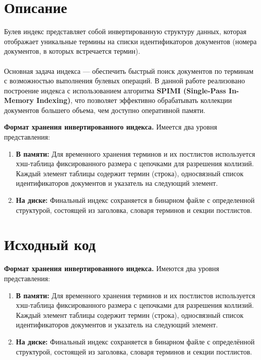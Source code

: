 \section{Описание}

Булев индекс представляет собой инвертированную структуру данных, которая отображает уникальные термины на списки идентификаторов документов (номера документов, в которых встречается термин). \\ \\
Основная задача индекса — обеспечить быстрый поиск документов по терминам с возможностью выполнения булевых операций. В данной работе реализовано построение индекса с использованием алгоритма \textbf{SPIMI (Single-Pass In-Memory Indexing)}, что позволяет эффективно обрабатывать коллекции документов большего объема, чем доступно оперативной памяти.

\vspace{1 em}
\noindent\textbf{Формат хранения инвертированного индекса.} Имеется два уровня представления:
\begin{enumerate}
    \item \textbf{В памяти:} Для временного хранения терминов и их постлистов используется хэш-таблица фиксированного размера с цепочками для разрешения коллизий. Каждый элемент таблицы содержит термин (строка), односвязный список идентификаторов документов и указатель на следующий элемент.
    \item \textbf{На диске:} Финальный индекс сохраняется в бинарном файле с определенной структурой, состоящей из заголовка, словаря терминов и секции постлистов.
\end{enumerate}

\pagebreak

\section{Исходный код}

\vspace{1 em}
\noindent\textbf{Формат хранения инвертированного индекса.} Имеются два уровня представления:
\begin{enumerate}
    \item \textbf{В памяти:} Для временного хранения терминов и их постлистов используется хэш-таблица фиксированного размера с цепочками для разрешения коллизий. Каждый элемент таблицы содержит термин (строка), односвязный список идентификаторов документов и указатель на следующий элемент.
    \item \textbf{На диске:} Финальный индекс сохраняется в бинарном файле с определённой структурой, состоящей из заголовка, словаря терминов и секции постлистов.
\end{enumerate}

